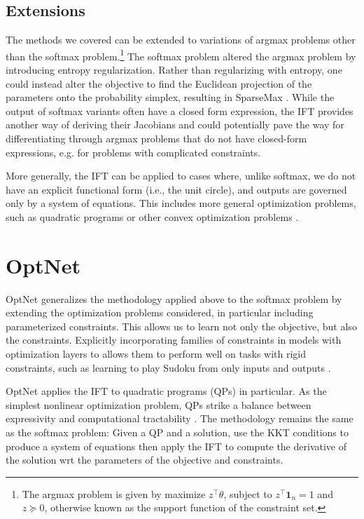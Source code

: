 \documentclass[11pt]{article}
\begin{document}
\subsection{Extensions}
The methods we covered can be extended to variations of argmax problems
other than the softmax problem.\footnote{
The argmax problem is given by maximize $z^\top \theta$, subject to $z^\top\mathbf{1}_n=1$
and $z\succeq 0$, otherwise known as the support function of the constraint set.
}
The softmax problem altered the argmax problem by introducing entropy regularization.
Rather than regularizing with entropy, one could instead alter the objective to find
the Euclidean projection of the parameters onto the probability simplex,
resulting in SparseMax \citep{sparsemax}.
While the output of softmax variants often have a closed form expression,
the IFT provides another way of deriving their Jacobians
and could potentially pave the way for differentiating through argmax problems
that do not have closed-form expressions, e.g. for problems with complicated constraints.

More generally, the IFT can be applied to cases where, unlike softmax,
we do not have an explicit functional form (i.e., the unit circle),
and outputs are governed only by a system of equations.
This includes more general optimization problems, such as quadratic programs \citep{optnet}
or other convex optimization problems \citep{agrawal2019diffcvx}.

\section{OptNet}
\label{sec:optnet}
OptNet generalizes the methodology applied above to the softmax problem by
extending the optimization problems considered,
in particular including parameterized constraints.
This allows us to learn not only the objective, but also the constraints.
Explicitly incorporating families of constraints in models
with optimization layers to allows them to perform well
on tasks with rigid constraints, such as learning to play
Sudoku from only inputs and outputs \citep{optnet}.

OptNet applies the IFT to quadratic programs (QPs) in particular.
As the simplest nonlinear optimization problem,
QPs strike a balance between expressivity and computational tractability \citep{simplex}.
The methodology remains the same as the softmax problem:
Given a QP and a solution,
use the KKT conditions to produce a system of equations then apply the IFT
to compute the derivative of the solution wrt the
parameters of the objective and constraints.
\end{document}
